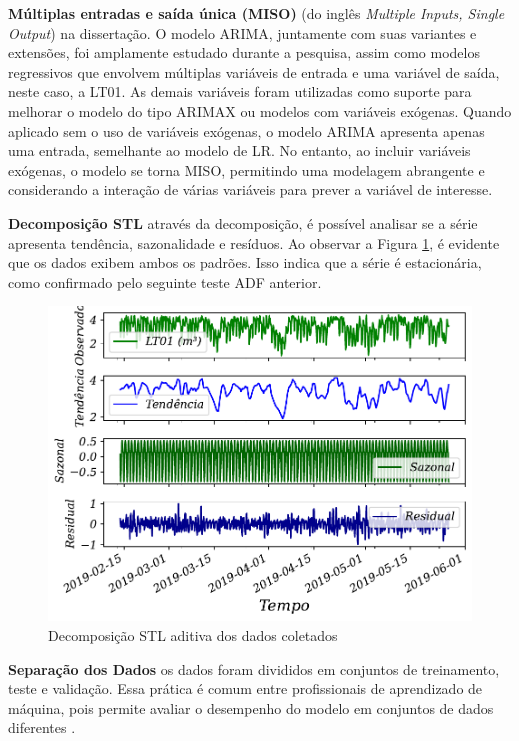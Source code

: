 \textbf{M\'ultiplas entradas e sa\'ida \'unica (MISO)}
(do inglês \textit{Multiple Inputs, Single Output}) na dissertação. O modelo ARIMA, juntamente com suas variantes e extensões, foi amplamente estudado durante a pesquisa, assim como modelos regressivos que envolvem múltiplas variáveis de entrada e uma variável de saída, neste caso, a LT01. As demais variáveis foram utilizadas como suporte para melhorar o modelo do tipo ARIMAX ou modelos com variáveis exógenas. Quando aplicado sem o uso de variáveis exógenas, o modelo ARIMA apresenta apenas uma entrada, semelhante ao modelo de LR. No entanto, ao incluir variáveis exógenas, o modelo se torna MISO, permitindo uma modelagem  abrangente e considerando a interação de várias variáveis para prever a variável de interesse.


\textbf{Decomposi\c c\~ao STL}
através da decomposição, é possível analisar se a série apresenta tendência, sazonalidade e resíduos. Ao observar a Figura \ref{fig:stl}, é evidente que os dados exibem ambos os padrões. Isso indica que a série é estacionária, como confirmado pelo seguinte teste ADF anterior.



\begin{figure}[!htb]
	\centering
	\caption{Decomposição STL aditiva dos dados coletados}
	\label{fig:stl}
	\includegraphics[width=0.8\linewidth]{Resultados/Figuras/STL}
	
	
	
\end{figure}






\textbf{Separa\c c\~ao dos Dados}
os dados foram divididos em conjuntos de treinamento, teste e validação. Essa prática é comum entre profissionais de aprendizado de máquina, pois permite avaliar o desempenho do modelo em conjuntos de dados diferentes \cite{raschka2015practical, geron2017hands_on}.

